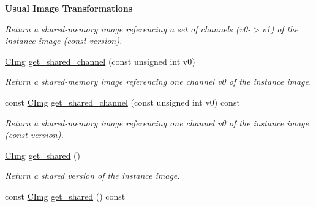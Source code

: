 \begin{Indent}{\bf Usual Image Transformations}
\begin{DoxyCompactItemize}
\begin{DoxyCompactList}\small\item\em Return a shared-\/memory image referencing a set of channels (v0-\/$>$v1) of the instance image (const version). \item\end{DoxyCompactList}\item 
\hypertarget{structcimg__library_1_1_c_img_a46c5055f274da78be826242e8f704628}{
\hyperlink{structcimg__library_1_1_c_img}{CImg} \hyperlink{structcimg__library_1_1_c_img_a46c5055f274da78be826242e8f704628}{get\_\-shared\_\-channel} (const unsigned int v0)}
\label{structcimg__library_1_1_c_img_a46c5055f274da78be826242e8f704628}

\begin{DoxyCompactList}\small\item\em Return a shared-\/memory image referencing one channel v0 of the instance image. \item\end{DoxyCompactList}\item 
\hypertarget{structcimg__library_1_1_c_img_a805e0c08d300c92cbe4dbc4b90259de7}{
const \hyperlink{structcimg__library_1_1_c_img}{CImg} \hyperlink{structcimg__library_1_1_c_img_a805e0c08d300c92cbe4dbc4b90259de7}{get\_\-shared\_\-channel} (const unsigned int v0) const }
\label{structcimg__library_1_1_c_img_a805e0c08d300c92cbe4dbc4b90259de7}

\begin{DoxyCompactList}\small\item\em Return a shared-\/memory image referencing one channel v0 of the instance image (const version). \item\end{DoxyCompactList}\item 
\hypertarget{structcimg__library_1_1_c_img_a9263118438e14cd176f1ac2c75fd4964}{
\hyperlink{structcimg__library_1_1_c_img}{CImg} \hyperlink{structcimg__library_1_1_c_img_a9263118438e14cd176f1ac2c75fd4964}{get\_\-shared} ()}
\label{structcimg__library_1_1_c_img_a9263118438e14cd176f1ac2c75fd4964}

\begin{DoxyCompactList}\small\item\em Return a shared version of the instance image. \item\end{DoxyCompactList}\item 
\hypertarget{structcimg__library_1_1_c_img_a804619d396b0673efdfe73e89b8fedc5}{
const \hyperlink{structcimg__library_1_1_c_img}{CImg} \hyperlink{structcimg__library_1_1_c_img_a804619d396b0673efdfe73e89b8fedc5}{get\_\-shared} () const }
\label{structcimg__library_1_1_c_img_a804619d396b0673efdfe73e89b8fedc5}


\end{DoxyCompactItemize}
\end{Indent}
